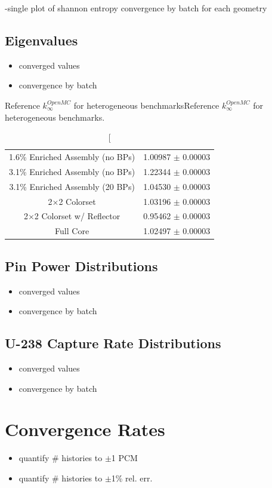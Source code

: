 -single plot of shannon entropy convergence by batch for each geometry

\subsection{Eigenvalues}

\begin{itemize}[noitemsep]
  \item converged values
  \item convergence by batch
\end{itemize}

\begin{table}[h!]
  \centering
  \caption[Reference $k^{OpenMC}_{\infty}$ for heterogeneous benchmarks{Reference $k^{OpenMC}_{\infty}$ for heterogeneous benchmarks.}
  \small
  \label{table:chap7-ref-eigenvalues}
  \vspace{6pt}
  \begin{tabular}{c c}
  \toprule
  1.6\% Enriched Assembly (no BPs) & 1.00987 $\pm$ 0.00003 \\
  3.1\% Enriched Assembly (no BPs) & 1.22344 $\pm$ 0.00003 \\
  3.1\% Enriched Assembly (20 BPs) & 1.04530 $\pm$ 0.00003 \\
  2$\times$2 Colorset & 1.03196 $\pm$ 0.00003 \\
  2$\times$2 Colorset w/ Reflector & 0.95462 $\pm$ 0.00003 \\
  Full Core & 1.02497 $\pm$ 0.00003 \\
  \bottomrule
\end{tabular}
\end{table}

\subsection{Pin Power Distributions}

\begin{itemize}[noitemsep]
  \item converged values
  \item convergence by batch
\end{itemize}

\subsection{U-238 Capture Rate Distributions}

\begin{itemize}[noitemsep]
  \item converged values
  \item convergence by batch
\end{itemize}


\section{Convergence Rates}

\begin{itemize}[noitemsep]
  \item quantify \# histories to $\pm$1 \ac{PCM}
  \item quantify \# histories to $\pm$1\% rel. err.
\end{itemize}